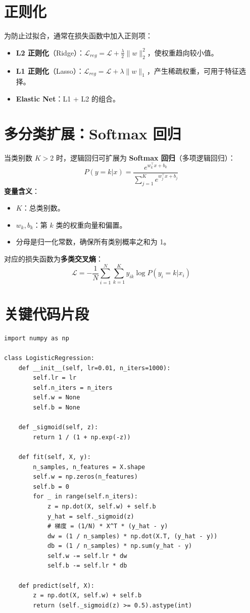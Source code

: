 \documentclass[12pt, a4paper]{article}
\begin{document}
\section{正则化}
为防止过拟合，通常在损失函数中加入正则项：
\begin{itemize}
    \item \textbf{L2 正则化}（Ridge）：$\mathcal{L}_{reg} = \mathcal{L} + \frac{\lambda}{2} \|w\|_2^2$，使权重趋向较小值。
    \item \textbf{L1 正则化}（Lasso）：$\mathcal{L}_{reg} = \mathcal{L} + \lambda \|w\|_1$，产生稀疏权重，可用于特征选择。
    \item \textbf{Elastic Net}：L1 + L2 的组合。
\end{itemize}

\section{多分类扩展：Softmax 回归}
当类别数 $K > 2$ 时，逻辑回归可扩展为 \textbf{Softmax 回归}（多项逻辑回归）：
$$ P(y = k | x) = \frac{e^{w_k^\top x + b_k}}{\sum_{j=1}^K e^{w_j^\top x + b_j}} $$
\textbf{变量含义}：
\begin{itemize}
    \item $K$：总类别数。
    \item $w_k, b_k$：第 $k$ 类的权重向量和偏置。
    \item 分母是归一化常数，确保所有类别概率之和为 1。
\end{itemize}
对应的损失函数为\textbf{多类交叉熵}：
$$ \mathcal{L} = -\frac{1}{N} \sum_{i=1}^N \sum_{k=1}^K y_{ik} \log P(y_i = k | x_i) $$

\section{关键代码片段}
\begin{lstlisting}
import numpy as np

class LogisticRegression:
    def __init__(self, lr=0.01, n_iters=1000):
        self.lr = lr
        self.n_iters = n_iters
        self.w = None
        self.b = None

    def _sigmoid(self, z):
        return 1 / (1 + np.exp(-z))

    def fit(self, X, y):
        n_samples, n_features = X.shape
        self.w = np.zeros(n_features)
        self.b = 0
        for _ in range(self.n_iters):
            z = np.dot(X, self.w) + self.b
            y_hat = self._sigmoid(z)
            # 梯度 = (1/N) * X^T * (y_hat - y)
            dw = (1 / n_samples) * np.dot(X.T, (y_hat - y))
            db = (1 / n_samples) * np.sum(y_hat - y)
            self.w -= self.lr * dw
            self.b -= self.lr * db

    def predict(self, X):
        z = np.dot(X, self.w) + self.b
        return (self._sigmoid(z) >= 0.5).astype(int)
\end{lstlisting}
\end{document}
